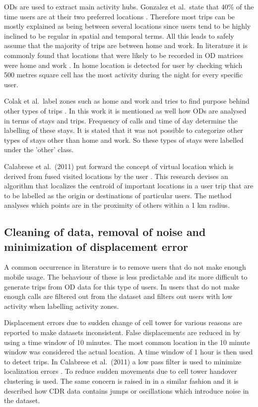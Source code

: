 \documentclass[12pt, a4paper]{report}
\theoremstyle{definition}
\theoremstyle{definition}%
\theoremstyle{definition}%
\theoremstyle{definition}%
\theoremstyle{definition}%
\theoremstyle{definition}%
\begin{document}
ODs are used to extract main activity hubs. Gonzalez et al.\ state that 40\% of the time users are at their two preferred locations \cite{Gonzalez2008}.  Therefore most trips can be mostly explained as being  between several locations since users tend to be highly inclined to be regular in spatial and temporal terms. All this leads to safely assume that the majority of trips are between home and work. In literature it  is commonly found that locations that were likely to be recorded in OD matrices were home and work \cite{Calabrese2011,Colak2015}.  In \cite{Calabrese2011} home location is detected for user by checking which 500 metres square cell has the most activity during the night for every specific user.

Colak et al.\ label zones such as home and work and tries to find purpose behind other types of trips \cite{Colak2015}. In this work it is mentioned as well how ODs are analysed in terms of stays and trips. Frequency of calls and time of day determine the labelling of these stays. It is stated that it was not possible to categorize other types of stays other than home and work. So these types of stays were labelled under the 'other' class.

Calabrese et al.\ (2011) put forward the concept of virtual location which is derived from fused visited locations by the user \cite{Calabrese2011}. This research devises an algorithm that localizes the centroid of important locations in a user trip that are to be labelled as the origin or destinations of particular users. The method analyses which points are in the proximity of others within a 1 km radius. 

 


\subsection{Cleaning of data, removal of noise and minimization of displacement error} \label{subsection: data_processing}
A common occurrence in literature is to remove users that do not make enough mobile usage. The behaviour of these is less predictable and its more difficult to generate trips from OD data for this type of users. In \cite{Toole2015} users that do not make enough calls are filtered out from the dataset and \cite{Colak2015} filters out users with low activity when labelling activity zones.

Displacement errors due to sudden change of cell tower for various reasons are reported to make datasets inconsistent. False displacements are reduced in \cite{Iqbal2014} by using a time window of 10 minutes. The most common location in the 10 minute window was considered the actual location. A time window of 1 hour is then used to detect trips. In Calabrese et al.\ (2011) a low pass filter is used to minimize localization errors \cite{Calabrese2011}. To reduce sudden movements due to cell tower handover clustering is used. The same concern is raised in \cite{Colak2015} in a similar fashion and it is described how CDR data contains jumps or oscillations which introduce noise in the dataset. 
\end{document}
